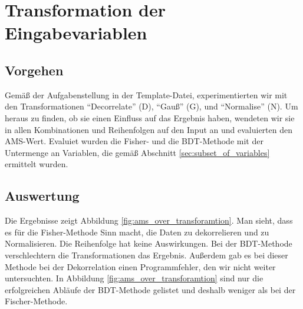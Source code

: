 \section{Transformation der Eingabevariablen}

\subsection{Vorgehen}
Gemäß der Aufgabenstellung in der Template-Datei, experimentierten wir mit den
Transformationen "`Decorrelate"' (D), "`Gauß"' (G), und "`Normalise"' (N).
Um heraus zu finden, ob sie einen Einfluss auf das Ergebnis haben, wendeten wir
sie in allen Kombinationen und Reihenfolgen auf den Input an und evaluierten den AMS-Wert. Evaluiet wurden die Fisher- und die BDT-Methode mit der Untermenge an Variablen, die gemäß Abschnitt \ref{sec:subset_of_variables} ermittelt wurden. 

\subsection{Auswertung}
Die Ergebnisse zeigt Abbildung \ref{fig:ams_over_transforamtion}. Man sieht, dass es für die Fisher-Methode Sinn macht, die Daten zu dekorrelieren
und zu Normalisieren. Die Reihenfolge hat keine Auswirkungen. Bei der
BDT-Methode verschlechtern die Transformationen das Ergebnis. Außerdem gab es
bei dieser Methode bei der Dekorrelation einen Programmfehler, den wir
nicht weiter untersuchten. In Abbildung \ref{fig:ams_over_transforamtion}
sind nur die erfolgreichen Abläufe der BDT-Methode gelistet und deshalb weniger
als bei der Fischer-Methode.


